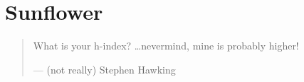 \chapter{Sunflower}
\begin{quote}
  What is your h-index? \dots nevermind, mine is probably higher!\par
  \hfill--- (not really) Stephen Hawking
\end{quote}

\lipsum[1-11]
